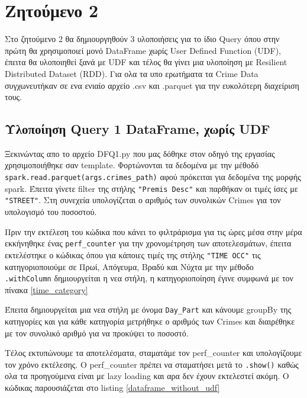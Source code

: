 \documentclass[12pt, a4paper]{article}
\begin{document}

\section*{Ζητούμενο 2}
Στο ζητούμενο 2 θα δημιουργηθούν 3 υλοποιήσεις για το ίδιο Query όπου στην
πρώτη θα χρησιμοποιεί μονό DataFrame χωρίς User Defined Function (UDF), έπειτα
θα υλοποιηθεί ξανά με UDF και τέλος θα γίνει μια υλοποίηση με Resilient 
Distributed Dataset (RDD). Για ολα τα υπο ερωτήματα τα Crime Data συγχωνευτήκαν σε ενα
ενιαίο αρχείο .csv και .parquet για την ευκολότερη διαχείριση τους.

\subsection*{Υλοποίηση Query 1 DataFrame, χωρίς UDF}

Ξεκινώντας απο το αρχείο DFQ1.py που μας δόθηκε στον οδηγό της εργασίας χρησιμοποιήθηκε σαν
template. Φορτώνονται τα δεδομένα με την μέθοδό \texttt{spark.read.parquet(args.crimes\_path)}
αφού πρόκειται για δεδομένα της μορφής spark. Έπειτα γίνετε filter της στήλης \texttt{"Premis Desc"}
και παρθήκαν οι τιμές ίσες με \texttt{"STREET"}. Στη συνεχεία υπολογίζεται ο αριθμός των συνολικών
Crimes για τον υπολογισμό του ποσοστού. 

Πριν την εκτέλεση του κώδικα που κάνει το φιλτράρισμα για τις ώρες μέσα στην μέρα εκκήνηθηκε
ένας \texttt{perf\_counter} για την χρονομέτρηση των αποτελεσμάτων, έπειτα εκτελέστηκε ο κώδικας
όπου για κάποιες τιμές της στήλης \texttt{"TIME OCC"} τις κατηγοριοποιούμε σε Πρωί, 
Απόγευμα, Βραδύ και Νύχτα με την μέθοδο \texttt{.withColumn} δημιουργείται η νεα στήλη, η κατηγοριοποίηση έγινε
συμφωνά με τον πίνακα \ref{time_category}

Έπειτα δημιουργείται μια νεα στήλη με όνομα \texttt{Day\_Part} και κάνουμε groupBy 
της κατηγορίες και για κάθε κατηγορία μετρήθηκε ο αριθμός των Crimes και διαιρέθηκε 
με τον συνολικό αριθμό για να προκύψει το ποσοστό. 

Τέλος εκτυπώνουμε τα αποτελέσματα, σταματάμε τον perf\_counter
και υπολογίζουμε τον χρόνο εκτέλεσης. Ο perf\_counter πρέπει να σταματήσει
μετά το \texttt{.show()} καθώς ολα τα προηγούμενα είναι με lazy loading και
αρα δεν έχουν εκτελεστεί ακόμη. 
Ο κώδικας παρουσιάζεται στο listing \ref{dataframe_without_udf}
\end{document}
